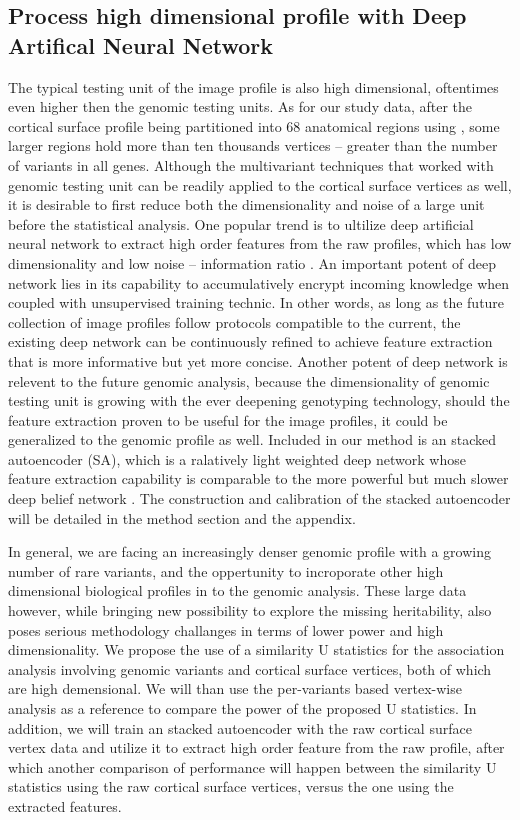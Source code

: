 \subsection{Process high dimensional profile with Deep Artifical Neural Network}
The typical testing unit of the image profile is also high dimensional, oftentimes even higher then the genomic testing units. As for our study data, after the cortical surface profile being partitioned into 68 anatomical regions using \FS, some larger regions hold more than ten thousands vertices -- greater than the number of variants in all genes. Although the multivariant techniques that worked with genomic testing unit can be readily applied to the cortical surface vertices as well, it is desirable to first reduce both the dimensionality and noise of a large unit before the statistical analysis. One popular trend is to ultilize deep artificial neural network to extract high order features from the raw profiles, which has low dimensionality and low noise -- information ratio \cite{DL:Intro1}. An important potent of deep network lies in its capability to accumulatively encrypt incoming knowledge when coupled with unsupervised training technic. In other words, as long as the future collection of image profiles follow protocols compatible to the current, the existing deep network can be continuously refined to achieve feature extraction that is more informative but yet more concise. Another potent of deep network is relevent to the future genomic analysis, because the dimensionality of genomic testing unit is growing with the ever deepening genotyping technology, should the feature extraction proven to be useful for the image profiles, it could be generalized to the genomic profile as well. Included in our method is an stacked autoencoder (SA), which is a ralatively light weighted deep network whose feature extraction capability is comparable to the more powerful but much slower deep belief network \cite{DL:SDA1, DL:Intro2}. The construction and calibration of the stacked autoencoder will be detailed in the method section and the appendix.

In general, we are facing an increasingly denser genomic profile with a growing number of rare variants, and the oppertunity to incroporate other high dimensional biological profiles in to the genomic analysis. These large data however, while bringing new possibility to explore the missing heritability, also poses serious methodology challanges in terms of lower power and high dimensionality. We propose the use of a similarity U statistics for the association analysis involving genomic variants and cortical surface vertices, both of which are high demensional. We will than use the per-variants based vertex-wise analysis as a reference to compare the power of the proposed U statistics. In addition, we will train an stacked autoencoder with the raw cortical surface vertex data and utilize it to extract high order feature from the raw profile, after which another comparison of performance will happen between the similarity U statistics using the raw cortical surface vertices, versus the one using the extracted features.